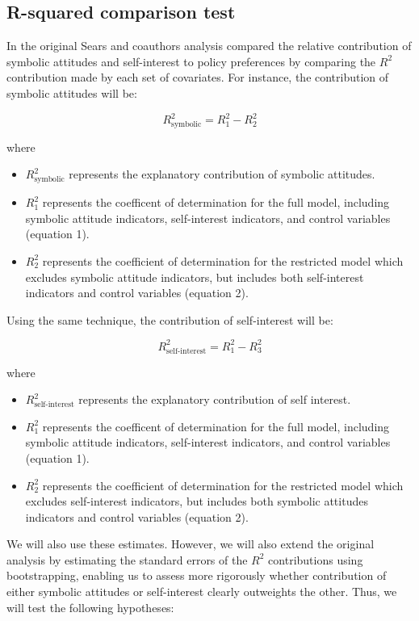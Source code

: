 \documentclass[]{article}
\begin{document}
\subsection{R-squared comparison test}\label{r-squared-comparison-test}

In the original Sears and coauthors analysis compared the relative
contribution of symbolic attitudes and self-interest to policy
preferences by comparing the \(R^2\) contribution made by each set of
covariates. For instance, the contribution of symbolic attitudes will
be:

\[R^2_{\text{symbolic}} = R^2_1 - R^2_2\]

where

\begin{itemize}
  \item $R^2_{\text{symbolic}}$ represents the explanatory contribution of symbolic attitudes.
  \item $R^2_1$ represents the coefficent of determination for the full model, including symbolic attitude indicators, self-interest indicators, and control variables (equation 1).
  \item $R^2_2$ represents the coefficient of determination for the restricted model which excludes symbolic attitude indicators, but includes both self-interest indicators and control variables (equation 2).
\end{itemize}

Using the same technique, the contribution of self-interest will be:

\[R^2_{\text{self-interest}} = R^2_1 - R^2_3\]

where

\begin{itemize}
  \item $R^2_{\text{self-interest}}$ represents the explanatory contribution of self interest.
  \item $R^2_1$ represents the coefficent of determination for the full model, including symbolic attitude indicators, self-interest indicators, and control variables (equation 1).
  \item $R^2_2$ represents the coefficient of determination for the restricted model which excludes self-interest indicators, but includes both symbolic attitudes indicators and control variables (equation 2).
\end{itemize}

We will also use these estimates. However, we will also extend the
original analysis by estimating the standard errors of the \(R^2\)
contributions using bootstrapping, enabling us to assess more rigorously
whether contribution of either symbolic attitudes or self-interest
clearly outweights the other. Thus, we will test the following
hypotheses:
\end{document}
